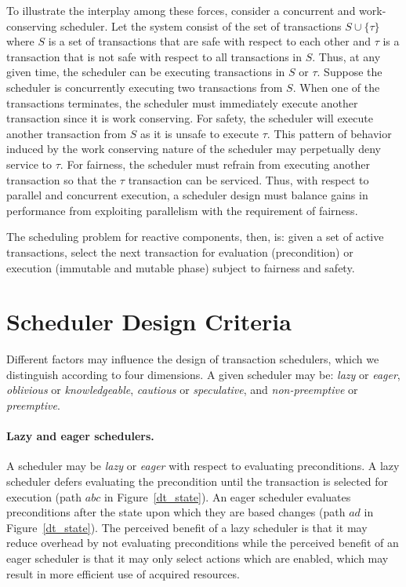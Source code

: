 To illustrate the interplay among these forces, consider a concurrent and work-conserving scheduler.
Let the system consist of the set of transactions $S \cup \{ \tau \}$ where $S$ is a set of transactions that are safe with respect to each other and $\tau$ is a transaction that is not safe with respect to all transactions in $S$.
Thus, at any given time, the scheduler can be executing transactions in $S$ or $\tau$.
Suppose the scheduler is concurrently executing two transactions from $S$.
When one of the transactions terminates, the scheduler must immediately execute another transaction since it is work conserving.
For safety, the scheduler will execute another transaction from $S$ as it is unsafe to execute $\tau$.
This pattern of behavior induced by the work conserving nature of the scheduler may perpetually deny service to $\tau$.
For fairness, the scheduler must refrain from executing another transaction so that the $\tau$ transaction can be serviced.
Thus, with respect to parallel and concurrent execution, a scheduler design must balance gains in performance from exploiting parallelism with the requirement of fairness.

The scheduling problem for reactive components, then, is:  given a set of active transactions, select the next transaction for evaluation (precondition) or execution (immutable and mutable phase) subject to fairness and safety.

\section{Scheduler Design Criteria}

Different factors may influence the design of transaction schedulers, which we distinguish according to four dimensions.
A given scheduler may be:  \emph{lazy} or \emph{eager}, \emph{oblivious} or \emph{knowledgeable}, \emph{cautious} or \emph{speculative}, and \emph{non-preemptive} or \emph{preemptive}.

\paragraph{Lazy and eager schedulers.}
A scheduler may be \emph{lazy} or \emph{eager} with respect to evaluating preconditions.
A lazy scheduler defers evaluating the precondition until the transaction is selected for execution (path $abc$ in Figure~\ref{dt_state}).
An eager scheduler evaluates preconditions after the state upon which they are based changes (path $ad$ in Figure~\ref{dt_state}).
The perceived benefit of a lazy scheduler is that it may reduce overhead by not evaluating preconditions while the perceived benefit of an eager scheduler is that it may only select actions which are enabled, which may result in more efficient use of acquired resources.


